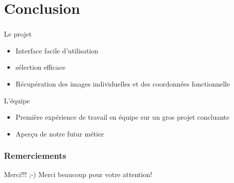 \documentclass[11pt]{beamer}
\begin{document}
\section{Conclusion}
\begin{frame}
\frametitle{\secname}
	\begin{block}{Le projet}
		\begin{itemize}
			\item Interface facile d'utilisation
			\item sélection efficace
			\item Récupération des images individuelles et des coordonnées fonctionnelle
		\end{itemize}
	\end{block}
	\begin{block}{L'équipe}
		\begin{itemize}
			\item Première expérience de travail en équipe sur un gros projet concluante
			\item Aperçu de notre futur métier
		\end{itemize}
	\end{block}
\end{frame}
\begin{frame}
	\frametitle{Remerciements}
	\begin{block}{Merci!!! ;-)}
		Merci beaucoup pour votre attention! %
	\end{block}
\end{frame}
\end{document}
